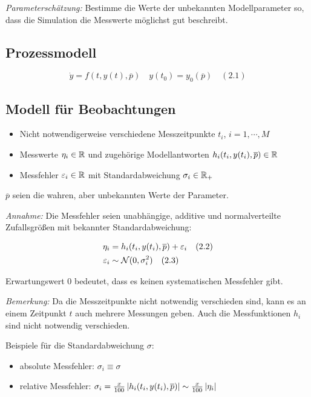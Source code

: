 
\emph{Parameterschätzung:} Bestimme die Werte der unbekannten Modellparameter so, dass die Simulation die Messwerte möglichst gut beschreibt.


\subsection*{Prozessmodell}

\[\dot y = f(t,y(t),\overline p) \quad y(t_0) = y_0(\overline p) \quad (2.1)\]

\subsection*{Modell für Beobachtungen}

\begin{itemize}
\item Nicht notwendigerweise verschiedene Messzeitpunkte $t_i$, $i=1,\cdots,M$
\item Messwerte $\eta_i \in \mathbb{R}$ und zugehörige Modellantworten $h_i (t_i, y(t_i), \overline p) \in \mathbb{R}$
\item Messfehler $\varepsilon_i \in \mathbb{R}$ mit Standardabweichung $\sigma_i \in \mathbb{R}_+$
\end{itemize}

$\overline p$ seien die wahren, aber unbekannten Werte der Parameter.

\emph{Annahme:} Die Messfehler seien unabhängige, additive und normalverteilte Zufallsgrößen mit bekannter Standardabweichung:

\begin{align*}
\eta_i &= h_i(t_i, y(t_i), \overline p) + \varepsilon_i \quad (2.2) \\
\varepsilon_i &\sim \mathcal N(0, \sigma_i^2) \quad (2.3)
\end{align*}

Erwartungswert $0$ bedeutet, dass es keinen systematischen Messfehler gibt.

\emph{Bemerkung:} Da die Messzeitpunkte nicht notwendig verschieden sind, kann es an einem Zeitpunkt $t$ auch mehrere Messungen geben. Auch die Messfunktionen $h_i$ sind nicht notwendig verschieden.

Beispiele für die Standardabweichung $\sigma:$

\begin{itemize}
\item absolute Messfehler: $\sigma_i \equiv \sigma$
\item relative Messfehler: $\sigma_i =  \frac x{100} \left| h_i(t_i,y(t_i),\overline p) \right| \sim \frac x{100} \left|\eta_i\right|$
\end{itemize}

